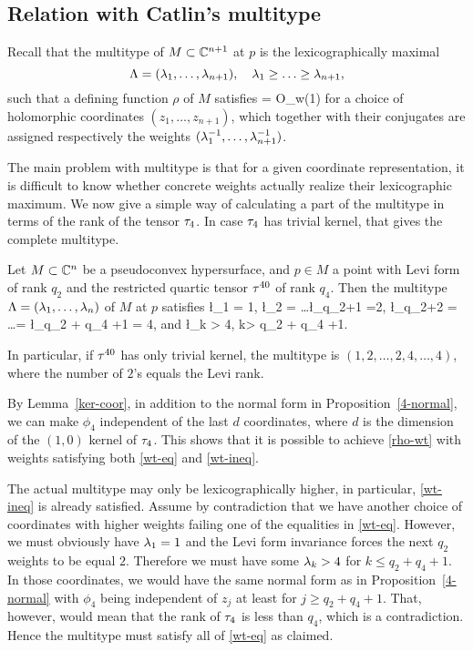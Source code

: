 \documentclass[12pt]{amsart}
\begin{document}
\subsection{Relation with Catlin's multitype}
Recall that the multitype of $M\subset {\mathbb{C}}^{n+1}$ at $p$
is the lexicographically maximal
$$
	\Lambda = (\lambda_1, \ldots, \lambda_{n+1}), 
	\quad
	\lambda_1 \ge \ldots \ge \lambda_{n+1},
$$
such that a defining function $\rho$ of $M$ 
satisfies 
\beq{}
	\rho = O_w(1)
\eeq
for a choice of holomorphic coordinates 
$(z_1, \ldots, z_{n+1})$,
which together with their conjugates are assigned 
respectively the weights 
$(\lambda_1^{-1}, \ldots, \lambda_{n+1}^{-1})$.

The main problem with multitype
is that for a given coordinate representation,
it is difficult to know whether concrete weights
actually realize their lexicographic maximum.
We now give a simple way of calculating a part 
of the multitype in terms of the rank of the tensor $\tau_4$.
In case $\tau_4$ has trivial kernel, that gives the complete multitype.

\bp{}
Let $M\subset {\mathbb{C}}^{n}$ be a pseudoconvex hypersurface,
and $p\in M$ a point with Levi form of rank $q_2$ 
and the restricted quartic tensor $\tau^{40}$ of rank $q_4$.
Then the multitype $\Lambda = (\lambda_1, \ldots, \lambda_{n})$ of $M$ at $p$
satisfies
\beq{}
	\l_1 = 1, 
	\quad
	\l_2 = \ldots \l_{q_2+1} =2, 
	\quad
	\l_{q_2+2} = \ldots = \l_{q_2 + q_4 +1} = 4,
\eeq
and 	
\beq{}
	\l_k > 4, \quad k> q_2 + q_4 +1.
\eeq

In particular, if $\tau^{40}$ has only trivial kernel,
the multitype is
$(1, 2,\ldots, 2, 4, \ldots, 4)$,
where the number of $2$'s equals the Levi rank.
\ep

\bpf
By Lemma~\ref{ker-coor}, 
in addition to the normal form in Proposition~\ref{4-normal},
we can make $\phi_4$ independent of the last $d$ coordinates,
where $d$ is the dimension of the $(1,0)$ kernel of $\tau_4$.
This shows that it is possible to achieve 
\eqref{rho-wt}
with weights
satisfying both \eqref{wt-eq} and \eqref{wt-ineq}.

The actual multitype may only be lexicographically higher,
in particular, \eqref{wt-ineq} is already satisfied.
Assume by contradiction that we have another choice of coordinates 
with higher weights failing one of the equalities in \eqref{wt-eq}.
However, we must obviously have $\lambda_1=1$
and the Levi form invariance forces the next $q_2$ weights to be equal $2$.
Therefore we must have some $\lambda_k > 4$ for $k\le q_2+q_4+1$.
In those coordinates, we would have the same normal form as in Proposition~\ref{4-normal}
with $\phi_4$ being independent of $z_j$ at least for $j\ge q_2 + q_4 +1$.
That, however, would mean that the rank of $\tau_4$ is less than $q_4$, which is a contradiction.
Hence the multitype must satisfy all of \eqref{wt-eq} as claimed.
\epf
\end{document}
